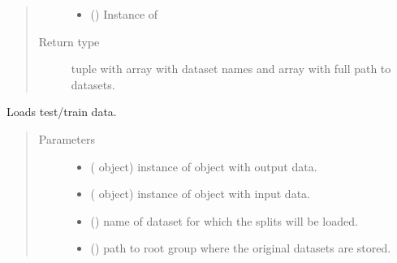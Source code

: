 \documentclass[letterpaper,10pt,english]{sphinxmanual}
\begin{document}
\begin{fulllineitems}
\begin{fulllineitems}
\begin{quote}
\begin{description}
\begin{itemize}
\item {} 
 ({\hyperref[\detokenize{shared:mleap.shared.files_io.FilesIO}]{}}) \textendash{} Instance of {\hyperref[\detokenize{shared:mleap.shared.files_io.FilesIO}]{}}

\end{itemize}

\item[{Return type}] \leavevmode
tuple with array with dataset names and array with full path to datasets.

\end{description}\end{quote}

\end{fulllineitems}


\begin{fulllineitems}
\label{\detokenize{data:mleap.data.data.Data.load_test_train_dts}}
Loads test/train data.
\begin{quote}\begin{description}
\item[{Parameters}] \leavevmode\begin{itemize}
\item {} 
 ({\hyperref[\detokenize{shared:mleap.shared.files_io.FilesIO}]{}} object) \textendash{} instance of {\hyperref[\detokenize{shared:mleap.shared.files_io.FilesIO}]{}} object with output data.

\item {} 
 ({\hyperref[\detokenize{shared:mleap.shared.files_io.FilesIO}]{}} object) \textendash{} instance of {\hyperref[\detokenize{shared:mleap.shared.files_io.FilesIO}]{}} object with input data.

\item {} 
 () \textendash{} name of dataset for which the splits will be loaded.

\item {} 
 () \textendash{} path to root group where the original datasets are stored.


\end{itemize}
\end{description}
\end{quote}
\end{fulllineitems}
\end{fulllineitems}
\end{document}
